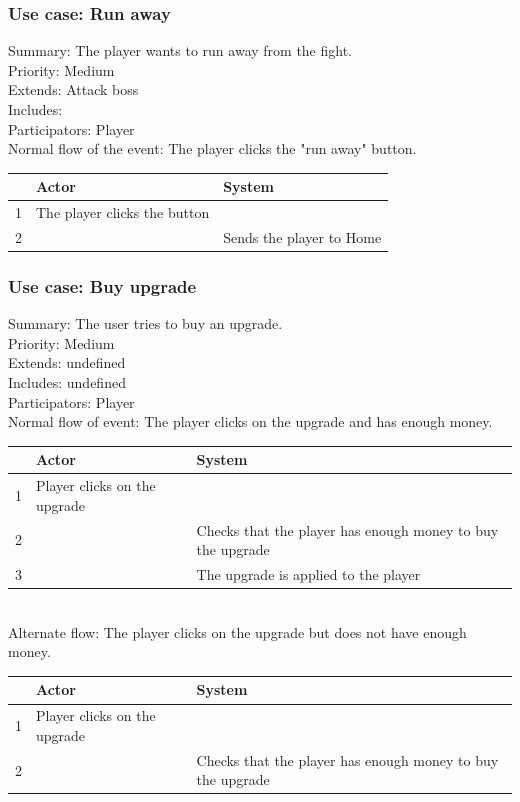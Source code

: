 \documentclass{article}
\begin{document}
\subsubsection{Use case: Run away}
Summary: The player wants to run away from the fight.\\
Priority: Medium \\
Extends: Attack boss\\
Includes:\\
Participators: Player\\
Normal flow of the event: The player clicks the "run away" button.\\
\begin{tabular}{|c|l|l|} \hline
    & Actor & System \\ \hline
    1 & The player clicks the button & \\ \hline
    2 & & Sends the player to Home \\ \hline
\end{tabular}

\subsubsection{Use case: Buy upgrade}
Summary: The user tries to buy an upgrade.\\
Priority: Medium\\
Extends: undefined\\
Includes: undefined\\
Participators: Player\\
Normal flow of event: The player clicks on the upgrade and has enough money.\\
\begin{tabular}{|c|l|l|} \hline
      & Actor & System \\ \hline
    1 & Player clicks on the upgrade & \\ \hline
    2 & & Checks that the player has enough money to buy the upgrade \\ \hline
    3 & & The upgrade is applied to the player \\ \hline
\end{tabular}\\ 
Alternate flow: The player clicks on the upgrade but does not have enough money. \\
\begin{tabular}{|c|l|l|} \hline
      & Actor & System \\ \hline
    1 & Player clicks on the upgrade & \\ \hline
    2 & & Checks that the player has enough money to buy the upgrade \\ \hline
\end{tabular} 
\end{document}
